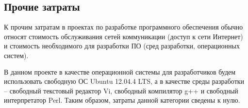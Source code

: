 \subsection{Прочие затраты} \label{other_costs}

К прочим затратам в проектах по разработке программного обеспечения обычно относят стоимость обслуживания сетей коммуникации (доступ к сети Интернет) и стоимость необходимого для разработки ПО (сред разработки, операционных систем).

\vspace{\baselineskip}
В данном проекте в качестве операционной системы для разработчиков будем использовать свободную ОС Ubuntu 12.04.4 LTS, а в качестве среды разработки -- свободный текстовый редактор Vi, свободный компилятор g++ и свободный интерпретатор Perl. Таким образом, затраты данной категории сведены к нулю.
